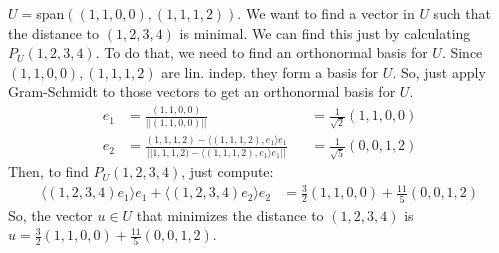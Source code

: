 \documentclass{article}
\begin{document}
$U = $span$((1,1, 0, 0), (1, 1, 1, 2))$. We want to find a vector in $U$ such that the distance to $(1, 2, 3, 4)$ is minimal. We can find this just by calculating $P_{U}(1, 2, 3, 4)$. To do that, we need to find an orthonormal basis for $U$. Since $(1, 1, 0, 0), (1, 1, 1, 2)$ are lin. indep. they form a basis for $U$. So, just apply Gram-Schmidt to those vectors to get an orthonormal basis for $U$. 
\begin{align*}
e_{1} &= \frac{(1, 1, 0 ,0)}{||(1, 1, 0, 0)||} &&= \frac{1}{\sqrt{2}}(1, 1, 0, 0)\\
e_{2} &= \frac{(1, 1, 1, 2) - \langle (1, 1, 1, 2),e_{1} \rangle e_{1} }{||1, 1, 1, 2) - \langle (1, 1, 1, 2),e_{1} \rangle e_{1}||} &&= \frac{1}{\sqrt{5}}(0, 0, 1, 2)
\end{align*}
Then, to find $P_{U}(1, 2, 3, 4)$, just compute:
\begin{align*}
\langle(1, 2, 3, 4)e_{1}\rangle e_{1} + \langle(1, 2, 3, 4)e_{2}\rangle e_{2} &= \frac{3}{2}(1, 1, 0, 0) + \frac{11}{5}(0, 0, 1, 2)
\end{align*}
So, the vector $u \in U$ that minimizes the distance to $(1, 2, 3, 4)$ is $u = \frac{3}{2}(1, 1, 0, 0) + \frac{11}{5}(0, 0, 1, 2)$.
\end{document}
